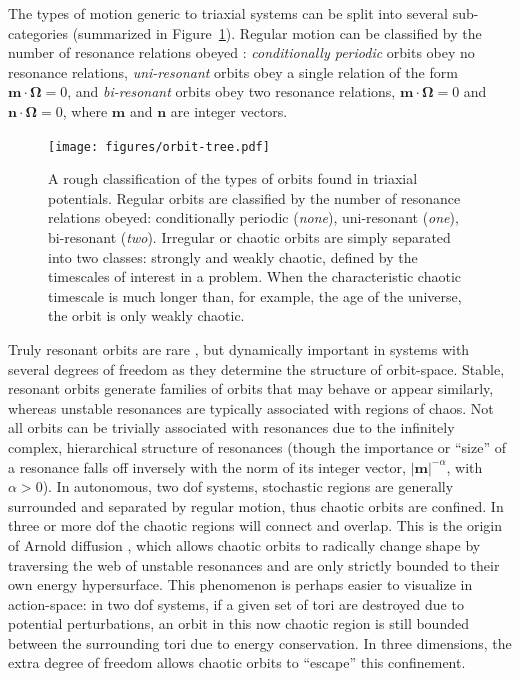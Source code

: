 \documentclass[letterpaper,12pt,preprint]{aastex}
\newcommand{\bs}[1]{\boldsymbol{#1}}
\begin{document}
The types of motion generic to triaxial systems can be split into several sub-categories (summarized in Figure~\ref{fig:orbit-tree}). Regular motion can be classified by the number of resonance relations obeyed \citep[e.g.,][]{lichtenberg83}: \emph{conditionally periodic} orbits obey no resonance relations, \emph{uni-resonant} orbits obey a single relation of the form $\bs{m}\cdot\bs{\Omega}=0$, and \emph{bi-resonant} orbits obey two resonance relations, $\bs{m}\cdot\bs{\Omega}=0$ and $\bs{n}\cdot\bs{\Omega}=0$, where $\bs{m}$ and $\bs{n}$ are integer vectors.

\begin{figure}[!h]
\begin{center}
\texttt{[image: figures/orbit-tree.pdf]}
\caption{A rough classification of the types of orbits found in triaxial potentials. Regular orbits are classified by the number of resonance relations obeyed: conditionally periodic (\emph{none}), uni-resonant (\emph{one}), bi-resonant (\emph{two}). Irregular or chaotic orbits are simply separated into two classes: strongly and weakly chaotic, defined by the timescales of interest in a problem. When the characteristic chaotic timescale is much longer than, for example, the age of the universe, the orbit is only weakly chaotic. } \label{fig:orbit-tree}
\end{center}
\end{figure}

Truly resonant orbits are rare \citep{merritt99}, but dynamically important in systems with several degrees of freedom as they determine the structure of orbit-space. Stable, resonant orbits generate families of orbits that may behave or appear similarly, whereas unstable resonances are typically associated with regions of chaos. Not all orbits can be trivially associated with resonances due to the infinitely complex, hierarchical structure of resonances (though the importance or ``size'' of a resonance falls off inversely with the norm of its integer vector, $|\bs{m}|^{-\alpha}$, with $\alpha > 0$). In autonomous, two dof systems, stochastic regions are generally surrounded and separated by regular motion, thus chaotic orbits are confined. In three or more dof the chaotic regions will connect and overlap. This is the origin of Arnold diffusion \citep{arnold64}, which allows chaotic orbits to radically change shape by traversing the web of unstable resonances and are only strictly bounded to their own energy hypersurface. This phenomenon is perhaps easier to visualize in action-space: in two dof systems, if a given set of tori are destroyed due to potential perturbations, an orbit in this now chaotic region is still bounded between the surrounding tori due to energy conservation. In three dimensions, the extra degree of freedom allows chaotic orbits to ``escape'' this confinement.
\end{document}
